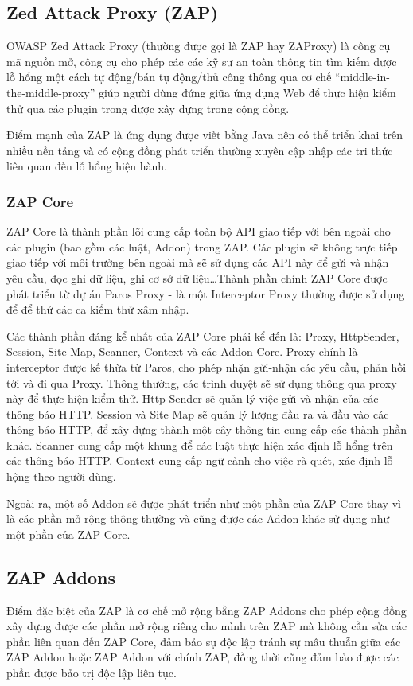 \documentclass[./../main.tex]{subfiles}
\begin{document}
\subsection{Zed Attack Proxy (ZAP)}
OWASP Zed Attack Proxy (thường được gọi là  ZAP hay ZAProxy) là công cụ mã nguồn mở,
công cụ cho phép các các kỹ sư an toàn thông tin tìm kiếm được lỗ hổng một cách tự
động/bán tự động/thủ công thông qua cơ chế “middle-in-the-middle-proxy” giúp người
dùng đứng giữa ứng dụng Web để thực hiện kiểm thử qua các plugin trong được xây dựng
trong cộng đồng.

Điểm mạnh của ZAP là ứng dụng được viết bằng Java nên có thể triển khai trên
nhiều nền tảng và có cộng đồng phát triển thường xuyên cập nhập các tri thức
liên quan đến lỗ hổng hiện hành.

\subsubsection{ZAP Core}

ZAP Core là thành phần lõi cung cấp toàn bộ API giao tiếp với bên ngoài cho các
plugin (bao gồm các luật, Addon) trong ZAP. Các plugin sẽ không trực tiếp giao tiếp
với môi trường bên ngoài mà sẽ sử dụng các API này để  gửi và nhận yêu cầu, đọc ghi
dữ liệu, ghi cơ sở dữ liệu\ldots Thành phần chính ZAP Core được phát triển từ dự án
Paros Proxy - là một Interceptor Proxy thường được sử dụng để để thử các ca kiểm thử
xâm nhập.

Các thành phần đáng kể nhất của ZAP Core phải kể đến là: Proxy, HttpSender, Session,
Site Map, Scanner, Context và các Addon Core. Proxy chính là interceptor được kế thừa
từ Paros, cho phép nhặn gửi-nhận các yêu cầu, phản hồi tới và đi qua Proxy. Thông
thường, các trình duyệt sẽ sử dụng thông qua proxy này để thực hiện kiểm thử. Http
Sender sẽ quản lý việc gửi và nhận của các thông báo HTTP. Session và Site Map sẽ quản lý
lượng đầu ra và đầu vào các thông báo HTTP, để xây dựng thành một cây thông tin cung
cấp các thành phần khác. Scanner cung cấp một khung để các luật thực hiện xác định
lỗ hổng trên các thông báo HTTP. Context cung cấp ngữ cảnh cho việc rà quét, xác định
lỗ hộng theo người dùng.

Ngoài ra, một số Addon sẽ được phát triển như một phần của ZAP Core thay vì
là các phần mở rộng thông thường và cũng được các Addon khác sử dụng như
một phần của ZAP Core.

\subsection{ZAP Addons}
Điểm đặc biệt của ZAP là cơ chế mở rộng bằng ZAP Addons cho phép cộng đồng
xây dựng được các phần mở rộng riêng cho mình trên ZAP mà không cần sửa
các phần liên quan đến ZAP Core, đảm bảo sự độc lập tránh sự mâu thuẫn giữa
các ZAP Addon hoặc ZAP Addon với chính ZAP, đồng thời cũng đảm bảo được các
phần được bảo trị độc lập liên tục.
\end{document}
